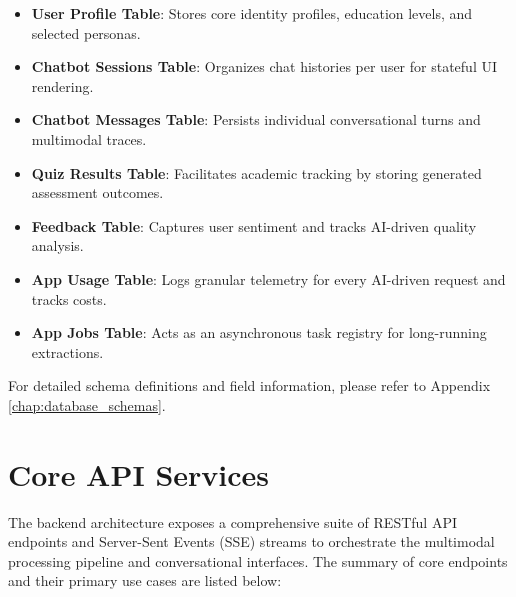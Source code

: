 \begin{itemize}
    \item \textbf{User Profile Table}: Stores core identity profiles, education levels, and selected personas.
    \item \textbf{Chatbot Sessions Table}: Organizes chat histories per user for stateful UI rendering.
    \item \textbf{Chatbot Messages Table}: Persists individual conversational turns and multimodal traces.
    \item \textbf{Quiz Results Table}: Facilitates academic tracking by storing generated assessment outcomes.
    \item \textbf{Feedback Table}: Captures user sentiment and tracks AI-driven quality analysis.
    \item \textbf{App Usage Table}: Logs granular telemetry for every AI-driven request and tracks costs.
    \item \textbf{App Jobs Table}: Acts as an asynchronous task registry for long-running extractions.
\end{itemize}

For detailed schema definitions and field information, please refer to Appendix \ref{chap:database_schemas}.

\section{Core API Services}
The backend architecture exposes a comprehensive suite of RESTful API endpoints and Server-Sent Events (SSE) streams to orchestrate the multimodal processing pipeline and conversational interfaces. The summary of core endpoints and their primary use cases are listed below:

